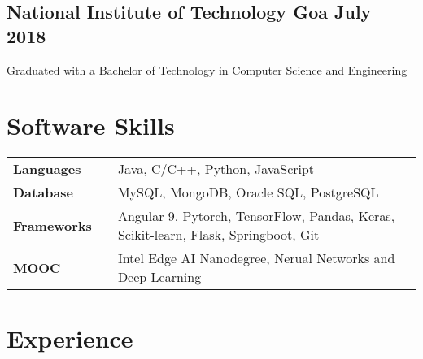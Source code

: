 \documentclass[a4,10pt]{article}
\newcommand{\hskills}[1]{
\textbf{\bfseries #1} }
\begin{document}
\subsection*{National Institute of Technology Goa  \hfill July 2018 } 
{Graduated with a Bachelor of Technology in Computer Science and Engineering } 
\vspace{-0.2cm}

\section{Software Skills}
\begin{tabular}{p{11em} p{1em} p{43em}}
\hskills{Languages }&  & Java, C/C++, Python, JavaScript \\
\hskills{Database}& & MySQL, MongoDB, Oracle SQL, PostgreSQL \\
\hskills{Frameworks}& &  Angular 9, Pytorch, TensorFlow, Pandas, Keras, Scikit-learn, Flask, Springboot, Git \\
\hskills{MOOC} &  & Intel Edge AI Nanodegree, Nerual Networks and Deep Learning  \\
\end{tabular}
\vspace{-0.2cm}


\section{Experience}

        
\end{document}
